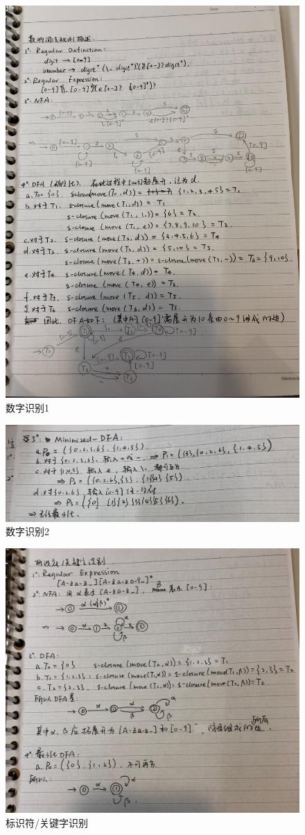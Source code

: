 \documentclass[lang=cn]{elegantpaper}
\begin{document}
\begin{figure}
	\centering
	\includegraphics[width=0.7\linewidth]{img/IMG_3154}
	\caption{数字识别1}
	\label{fig:img3154}
\end{figure}

\begin{figure}
	\centering
	\includegraphics[width=0.7\linewidth]{img/IMG_3155}
	\caption{数字识别2}
	\label{fig:img3155}
\end{figure}

\begin{figure}
	\centering
	\includegraphics[width=0.7\linewidth]{img/IMG_3156}
	\caption{标识符/关键字识别}
	\label{fig:img3156}
\end{figure}
\end{document}

